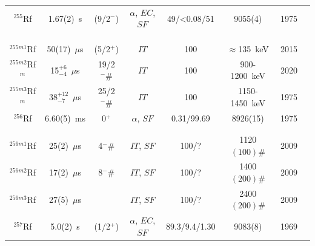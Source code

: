 \begin{center}
\begin{longtable}{c|ccccccl}
$^{255}$Rf	& 1.67(2)~s		&(9/2$^-$)	&$\alpha$, $EC$, $SF$&49/<0.08/51& 9055(4)			&1975	&{\tiny\cite{Oganessian1970a,Oganessian1975a,Demin1984,Oganessian1984a,Hessberger1985a,Hessberger1986}}\\
			&				&			&					&			& 				    &		&{\tiny\cite{Muenzenberg1987,Hessberger1989,Iljinov1989,Muenzenberg1989a,Hessberger1997,Hofmann1997}}\\
			&				&			&					&			& 				    &		&{\tiny\cite{Holden2000,Hessberger2001,Oganessian2007a,Dragojevic2008,Asai2011,Antalic2015}}\\
			&				&			&					&			& 				    &		&{\tiny\cite{Antalic2015,Khuyagbaatar2020b,Mosat2020}}\\			
$^{255m1}$Rf	& 50(17)~$\mu$s	&(5/2$^+$)&$IT$				&100		& $\approx$135~keV  &2015	&{\tiny\cite{Antalic2015,Khuyagbaatar2020b,Mosat2020,Mosat2025}}\\
$^{255m2}$Rf$^m$&15$^{+6}_{-4}$~$\mu$s&19/2$^- \#$&$IT$		&100		& 900-1200~keV	    &2020	&{\tiny\cite{Khuyagbaatar2020b,Mosat2020}}\\
$^{255m3}$Rf$^m$&38$^{+12}_{-7}$~$\mu$s&25/2$^- \#$&$IT$	&100		& 1150-1450~keV	    &1975	&{\tiny\cite{Mosat2020}}\\
$^{256}$Rf	& 6.60(5)~ms	&  0$^+$	&$\alpha$, $SF$		&0.31/99.69	& 8926(15)		    &1975	&{\tiny\cite{Oganessian1975a,Oganessian1984a,Hessberger1985a,Muenzenberg1985,Somerville1985,Hessberger1997}}\\
			&				&			&					&			& 				    &		&{\tiny\cite{Dragojevic2008,Greenlees2012,Lopez-Martens2019,Yeremin2019,Mosat2020,Kuznetsova2020}}\\
			&				&			&					&			& 				    &		&{\tiny\cite{Tezekbayeva2021,Khuyagbaatar2021,Isaev2023}}\\
$^{256m1}$Rf& 25(2)~$\mu$s	&4$^- \#$   &$IT$, $SF$		    &100/?		& 1120$(100)\#$     &2009	&{\tiny\cite{Jeppesen2009,Berryman2010,Robinson2011,Rissanen2013,Khuyagbaatar2021}}\\
$^{256m2}$Rf& 17(2)~$\mu$s	&8$^- \#$   &$IT$, $SF$		    &100/?		& 1400$(200)\#$     &2009	&{\tiny\cite{Jeppesen2009,Berryman2010,Robinson2011,Rissanen2013,Khuyagbaatar2021}}\\
$^{256m3}$Rf& 27(5)~$\mu$s	& 		    &$IT$, $SF$			&100/?		& 2400$(200)\#$     &2009	&{\tiny\cite{Jeppesen2009,Berryman2010,Robinson2011,Rissanen2013,Khuyagbaatar2021}}\\
$^{257}$Rf	& 5.0(2)~s		&  (1/2$^+$)&$\alpha$, $EC$, $SF$&89.3/9.4/1.30& 9083(8)		&1969	&{\tiny\cite{Ghiorso1969,Ghiorso1971,Bemis1973,Bemis1974,Oganessian1984,Hessberger1985a}}\\

\end{longtable}
\end{center}
